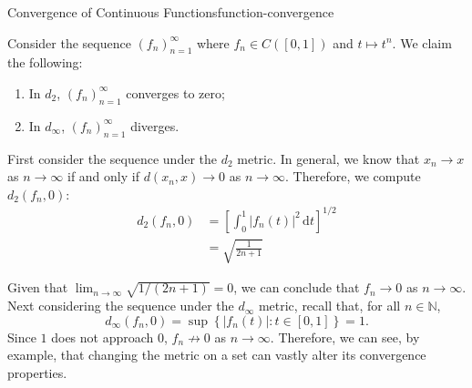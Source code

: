 \documentclass{article}
\numberwithin{equation}{section}
\numberwithin{figure}{section}
\begin{document}
\begin{example}{Convergence of Continuous Functions}{function-convergence}
    \begin{minipage}{.55\linewidth}
        Consider the sequence $ \left( f_n \right)_{n=1}^\infty $ where $ f_n
        \in C\left( [0, 1] \right) $ and $ t \mapsto t^n $. We claim the
        following:
        \begin{enumerate}
            \item In $ d_2 $, $ \left(f_n\right)_{n=1}^\infty $ converges to
                zero;
            \item In $ d_\infty $, $ \left(f_n\right)_{n=1}^\infty $ diverges.
        \end{enumerate}
        First consider the sequence under the $ d_2 $ metric. In general, we
        know that $ x_n \to x $ as $ n \to \infty $ if and only if $ d(x_n, x)
        \to 0 $ as $ n \to \infty $. Therefore, we compute $ d_2(f_n, 0) $:
        \begin{align}
            d_2(f_n, 0) &= \left[ \int_0^1 \left\vert f_n(t) \right\vert^2 \,
                \mathrm{d}t \right]^{1/2} \\
            &= \sqrt{\frac{1}{2n+1}}
        \end{align}
    \end{minipage}\hfill
    \begin{minipage}{.4\linewidth}
        \centering
    \end{minipage}

    Given that $ \lim_{n \to \infty}\sqrt{1/(2n+1)} = 0 $, we can conclude that
    $ f_n \to 0 $ as $ n \to \infty $. Next considering the sequence under the
    $ d_\infty $ metric, recall that, for all $ n \in \mathbb{N} $,
    \begin{equation}
        d_\infty(f_n, 0) = \sup\left\{ \left\vert f_n(t) \right\vert \colon t
        \in [0, 1] \right\} = 1.
    \end{equation}
    Since $ 1 $ does not approach $ 0 $, $ f_n \not\to 0 $ as $ n \to \infty $.
    Therefore, we can see, by example, that changing the metric on a set can
    vastly alter its convergence properties.
\end{example}
\end{document}
